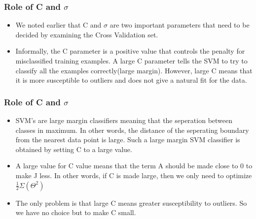 \documentclass[11pt,xcolor=dvipsnames]{beamer}
\begin{document}
\begin{frame}
\frametitle{Role of C and $\sigma$}
\begin{itemize}
\item We noted earlier that C and $\sigma$ are two important parameters that need to be decided by examining the Cross Validation set.\\
\item  Informally, the C parameter is a positive value that controls the penalty for misclassified training examples. A large C parameter tells the SVM to try to classify all the examples correctly(large margin). However, large C means that it is more susceptible to outliers and does not give a natural fit for the data.
\end{itemize}
\end{frame}


\begin{frame}
\frametitle{Role of C and $\sigma$}
\begin{itemize}
\item SVM's are large margin classifiers meaning that the seperation between classes in maximum. In other words, the distance of the seperating boundary from the nearest data point is large. Such a large margin SVM classifier is obtained by setting C to a large value.\\
\item A large value for C value means that the term A should be made close to 0 to make J less. In other words, if C is made large, then we only need to optimize $\frac{1}{2}\Sigma(\Theta^2)$\\
\item The only problem is that large C means greater susceptibility to outliers. So we have no choice but to make C small.    
\end{itemize}
\end{frame}
\end{document}
